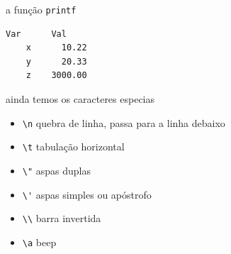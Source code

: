 \documentclass{beamer}
\begin{document}
\begin{frame}{a função \texttt{printf}}
  \begin{lstlisting}[style=code]
    Var      Val
    x      10.22
    y      20.33
    z    3000.00
  \end{lstlisting}

  \framebreak

  ainda temos os caracteres especias

  \begin{itemize}
  \item \verb|\n| quebra de linha, passa para a linha debaixo
  \item \verb|\t| tabulação horizontal
  \item \verb|\"| aspas duplas
  \item \verb|\'| aspas simples ou apóstrofo
  \item \verb|\\| barra invertida
  \item \verb|\a| beep 
  \end{itemize}

\end{frame}  
\end{document}
